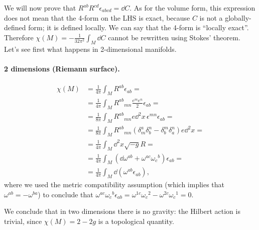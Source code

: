 \documentclass[a4paper,12pt]{book}
\begin{document}
We will now prove that $R^{ab}R^{cd}\epsilon_{abcd}=\dd C$. As for the volume form, this expression does not mean that the 4-form on the LHS is exact, because $C$ is not a globally-defined form; it is defined locally. We can say that the 4-form is ``locally exact''. Therefore $\chi(M)=-\frac1{32\pi^2}\int_M\dd C$ cannot be rewritten using Stokes' theorem. Let's see first what happens in 2-dimensional manifolds.
\paragraph{2 dimensions (Riemann surface).}
\begin{align*}
\chi(M)&=\frac1{4\pi}\int_MR^{ab}\epsilon_{ab}=\\
&=\frac1{4\pi}\int_MR^{ab}{}_{mn}\frac{e^me^n}{2}\epsilon_{ab}=\\
&=\frac1{8\pi}\int_MR^{ab}{}_{mn}e\dd^2x\,\epsilon^{mn}\epsilon_{ab}=\\
&=\frac1{8\pi}\int_MR^{ab}{}_{mn}(\delta^a_m\delta^n_b-\delta^m_b\delta^n_a)e\dd^2x=\\
&=\frac1{4\pi}\int_M\dd^2x\sqrt{-g}R=\\
&=\frac1{4\pi}\int_M(\dd\omega^{ab}+\omega^{ac}\omega_c{}^b)\epsilon_{ab}=\\
&=\frac1{4\pi}\int_M\dd(\omega^{ab}\epsilon_{ab}),
\end{align*}
where we used the metric compatibility assumption (which implies that $\omega^{ab}=-\omega^{ba}$) to conclude that $\omega^{ac}\omega_c{}^b\epsilon_{ab}=\omega^{1c}\omega_c{}^2-\omega^{2c}\omega_c{}^1=0$.

We conclude that in two dimensions there is no gravity: the Hilbert action is trivial, since $\chi(M)=2-2g$ is a topological quantity.
\end{document}
